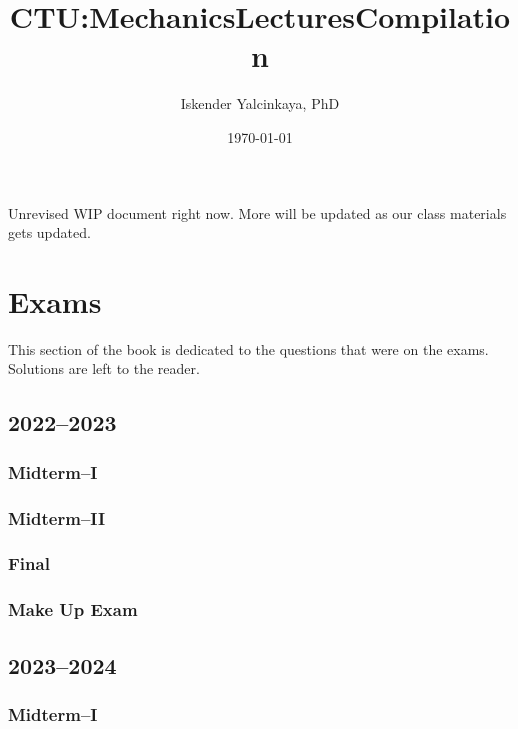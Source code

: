 \documentclass[a4paper,12pt]{book}
\title{CTU:\@ Mechanics\@ Lectures\@ Compilation}
\author{Iskender Yalcinkaya, PhD}
\date{\today}
\begin{document}
\maketitle
\frontmatter
Unrevised WIP document right now. More will be updated as our class materials gets updated.
\tableofcontents
\mainmatter















\appendix
\chapter{Exams}
This section of the book is dedicated to the questions that were on the exams. Solutions are left to the reader.
\section{2022--2023}

\subsection{Midterm--I}


\subsection{Midterm--II}


\subsection{Final}


\subsection{Make Up Exam}


\section{2023--2024}


\subsection{Midterm--I}

\end{document}
